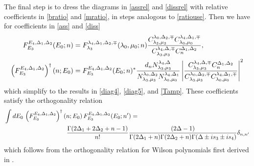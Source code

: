 \documentclass[12pt]{article}
\newcommand{\nn}{\nonumber\\}
\newcommand{\lam}{\lambda}
\newcommand{\Ga}{\Gamma}
\newcommand{\de}{\delta}
\newcommand{\De}{\Delta}
\newcommand{\ov}{\over}
\begin{document}
The final step is to dress the diagrams in \eqref{assrel} and \eqref{dissrel} with relative coefficients in \eqref{bratio} and \eqref{mratio}, in steps analogous to \eqref{ratiouse}. Then we have for coefficients in \eqref{ass} and \eqref{diss}
\begin{align}
F^{E_4, \De_1, \De_2}_{E_3}(E_0; n)&=F^{\lam_4, \De_1, \De_2, \mp}_{\lam_3}(\lam_0, \mu_0; n) { C_{\lam_3, \mu_3}^{\lam_0, \De_2, \mp}C_{\lam_0, \mu_0}^{\lam_4, \De_1, \mp} \ov C_{\lam_3, \mu_3}^{\lam_4, \De, \mp}C_{n}^{\De_1, \De_2}},\\
\left(F^{E_4, \De_1, \De_2}_{E_3}\right)^{\dagger}(n; E_0)&=F_{E_3}^{E_4, \De_1, \De_2}(E_0; n)^*{d_n N_{\lam_3, \mu_3}^{\lam_4, \De} \ov N_{\lam_3, \mu_3}^{\lam_0, \De_2} N_{\lam_0, \mu_0}^{\lam_4, \De_1}}\left|{  C_{\lam_3, \mu_3}^{\lam_4, \De, \mp}C_{n}^{\De_1, \De_2} \ov C_{\lam_3, \mu_3}^{\lam_0, \De_2, \mp}C_{\lam_0, \mu_0}^{\lam_4, \De_1, \mp} }\right|^2
\end{align}
which simplify to the results in \eqref{diag4}, \eqref{diag5}, and \eqref{Tamp}. These coefficients satisfy the orthogonality relation
\begin{align}
&\int dE_0\,  \left(F_{E_3}^{E_4, \De_1, \De_2}\right)^{\dagger}(n; E_0)\, F_{E_3}^{E_4, \De_1, \De_2}(E_0; n')=\nn
&\hspace{100pt}{\Ga(2 \De_1 + 2 \De_2 + n-1) \ov n!}{(2 \De-1) \ov \Ga(2 \De_1 +n)\Ga(2 \De_2 +n)\Ga(\De \pm i s_3 \pm i s_4)}\de_{n, n'}
\end{align}
which follows from the orthogonality relation for Wilson polynomials first derived in \cite{Wil80}.






 
\end{document}
